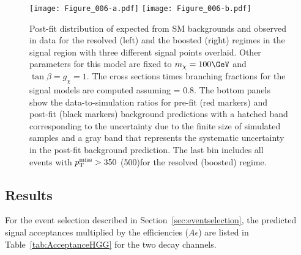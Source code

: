 \begin{figure}[htbp]
\centering
\texttt{[image: Figure\_006-a.pdf]}
\texttt{[image: Figure\_006-b.pdf]}
\caption{Post-fit distribution of \MET expected from SM backgrounds and observed in data for the resolved (left) and the boosted (right) regimes in the signal region with three different \mzp signal points overlaid. Other parameters for this model are fixed to $m_{\chi} = 100\GeV$ and $\tan{\beta} = g_{\chi} = 1$. The cross sections times branching fractions for the signal models are computed assuming \gzp = 0.8. The bottom panels show the data-to-simulation ratios for pre-fit (red markers) and post-fit (black markers) background predictions with a hatched band corresponding to the uncertainty due to the finite size of simulated samples and a gray band that represents the systematic uncertainty in the post-fit background prediction. The last bin includes all events with $p_{\mathrm{T}}^{\text{miss}} > 350 $ (500)\GeV for the resolved (boosted) regime.}
\label{fig:finalSignalPlots}
\end{figure}



\subsection{Results \label{sec:results}}
For the event selection described in Section~\ref{sec:eventselection}, the predicted signal acceptances multiplied by the efficiencies ($A \epsilon$) are listed in Table~\ref{tab:AcceptanceHGG} for the two decay channels.
 
